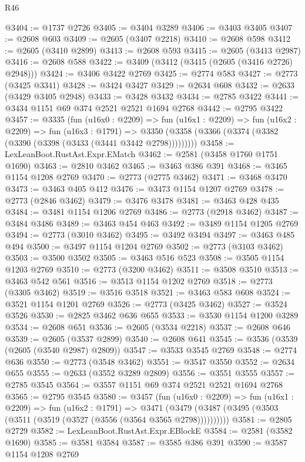 \begin{lexlean}{R46}
\begin{coremodule}
@3404 := @1737 @2726
@3405 := @3404 @3289
@3406 := @3403 @3405
@3407 := @2608 @603
@3409 := @2605 (@3407 @2218)
@3410 := @2608 @598
@3412 := @2605 (@3410 @2899)
@3413 := @2608 @593
@3415 := @2605 (@3413 @2987)
@3416 := @2608 @588
@3422 := @3409 (@3412 (@3415 (@2605 (@3416 @2726) @2948)))
@3424 := @3406 @3422 @2769
@3425 := @2774 @583
@3427 := @2773 (@3425 @3341)
@3428 := @3424 @3427
@3429 := @2634 @608
@3432 := @2633 (@3429 @3405 @2948)
@3433 := @3428 @3432
@3434 := @2785 @3422
@3441 := @3434 @1151 @69 @374 @2521 @2521 @1694 @2768
@3442 := @2795 @3422
@3457 := @3335
    (fun (u16x0 : @2209) =>
    fun (u16x1 : @2209) =>
    fun (u16x2 : @2209) =>
    fun (u16x3 : @1791) =>
    @3350 (@3358 (@3366 (@3374 (@3382 (@3390 (@3398 (@3433 (@3441 @3442 @2798)))))))))
@3458 := LexLeanBoot.RustAst.Expr.EMatch
@3462 := @2581 (@3458 @1760 @1751 @1690)
@3463 := @2810 @3462
@3465 := @3463 @386 @391
@3468 := @3465 @1154 @1208 @2769
@3470 := @2773 (@2775 @3462)
@3471 := @3468 @3470
@3473 := @3463 @405 @412
@3476 := @3473 @1154 @1207 @2769
@3478 := @2773 (@2846 @3462)
@3479 := @3476 @3478
@3481 := @3463 @428 @435
@3484 := @3481 @1154 @1206 @2769
@3486 := @2773 (@2918 @3462)
@3487 := @3484 @3486
@3489 := @3463 @454 @463
@3492 := @3489 @1154 @1205 @2769
@3494 := @2773 (@3010 @3462)
@3495 := @3492 @3494
@3497 := @3463 @485 @494
@3500 := @3497 @1154 @1204 @2769
@3502 := @2773 (@3103 @3462)
@3503 := @3500 @3502
@3505 := @3463 @516 @523
@3508 := @3505 @1154 @1203 @2769
@3510 := @2773 (@3200 @3462)
@3511 := @3508 @3510
@3513 := @3463 @542 @561
@3516 := @3513 @1154 @1202 @2769
@3518 := @2773 (@3305 @3462)
@3519 := @3516 @3518
@3521 := @3463 @583 @608
@3524 := @3521 @1154 @1201 @2769
@3526 := @2773 (@3425 @3462)
@3527 := @3524 @3526
@3530 := @2825 @3462 @636 @655
@3533 := @3530 @1154 @1200 @3289
@3534 := @2608 @651
@3536 := @2605 (@3534 @2218)
@3537 := @2608 @646
@3539 := @2605 (@3537 @2899)
@3540 := @2608 @641
@3545 := @3536 (@3539 (@2605 (@3540 @2987) @2809))
@3547 := @3533 @3545 @2769
@3548 := @2774 @636
@3550 := @2773 (@3548 @3462)
@3551 := @3547 @3550
@3552 := @2634 @655
@3555 := @2633 (@3552 @3289 @2809)
@3556 := @3551 @3555
@3557 := @2785 @3545
@3564 := @3557 @1151 @69 @374 @2521 @2521 @1694 @2768
@3565 := @2795 @3545
@3580 := @3457
    (fun (u16x0 : @2209) =>
    fun (u16x1 : @2209) =>
    fun (u16x2 : @1791) =>
    @3471 (@3479 (@3487 (@3495 (@3503 (@3511 (@3519 (@3527 (@3556 (@3564 @3565 @2798))))))))))
@3581 := @2805 @2729
@3582 := LexLeanBoot.RustAst.Expr.EBlockE
@3584 := @2581 (@3582 @1690)
@3585 := @3581 @3584
@3587 := @3585 @386 @391
@3590 := @3587 @1154 @1208 @2769

\end{coremodule}
\end{lexlean}
